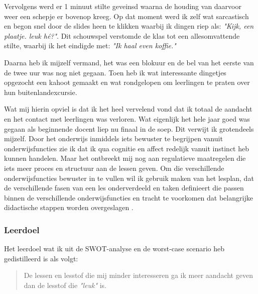 Vervolgens werd er 1 minuut stilte geveinsd waarna de houding van daarvoor weer een schepje er bovenop kreeg. Op dat moment werd ik zelf wat sarcastisch en begon snel door de slides heen te klikken waarbij ik dingen riep als: \textit{"Kijk, een plaatje. leuk hé?"}. Dit schouwspel verstomde de klas tot een allesomvattende stilte, waarbij ik het eindigde met: \textit{"Ik haal even koffie."}

Daarna heb ik mijzelf vermand, het was een blokuur en de bel van het eerste van de twee uur was nog niet gegaan. Toen heb ik wat interessante dingetjes opgezocht een kahoot gemaakt en wat rondgelopen om leerlingen te praten over hun buitenlandexcursie.

Wat mij hierin opviel is dat ik het heel vervelend vond dat ik totaal de aandacht en het contact met leerlingen was verloren. Wat eigenlijk het hele jaar goed was gegaan als beginnende docent liep nu finaal in de soep. Dit verwijt ik grotendeels mijzelf. Door het onderwijs inmiddels iets bewuster te begrijpen vanuit onderwijsfuncties \cite[p.45-62]{kallenberg2014leren} zie ik dat ik qua cognitie en affect redelijk vanuit instinct heb kunnen handelen. Maar het ontbreekt mij nog aan regulatieve maatregelen die iets meer proces en structuur aan de lessen geven. Om die verschillende onderwijsfuncties bewuster in te vullen wil ik gebruik maken van het lesplan, dat de verschillende fasen van een les onderverdeeld en taken definieert die passen binnen de verschillende onderwijsfuncties en tracht te voorkomen dat belangrijke didactische stappen worden overgeslagen \cite[p.163-169]{bijkerk2015activerend}.

\subsubsection{Leerdoel}
Het leerdoel wat ik uit de SWOT-analyse en de worst-case scenario heb gedistilleerd is als volgt:
\begin{quote}
  De lessen en lesstof die mij minder interesseren ga ik meer aandacht geven dan de lesstof die \textit{"leuk"} is.
\end{quote}

